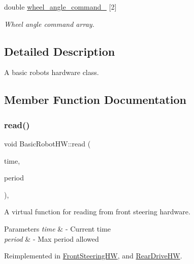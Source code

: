\begin{DoxyCompactItemize}
\mbox{\label{classBasicRobotHW_a10eda38eb2d290958f80f4bbeb33a66d}} 
double \hyperlink{classBasicRobotHW_a10eda38eb2d290958f80f4bbeb33a66d}{wheel\+\_\+angle\+\_\+command\+\_\+} \mbox{[}2\mbox{]}
\begin{DoxyCompactList}\small\item\em Wheel angle command array. \end{DoxyCompactList}\end{DoxyCompactItemize}


\subsection{Detailed Description}
A basic robot\textquotesingle{}s hardware class. 

\subsection{Member Function Documentation}
\mbox{\label{classBasicRobotHW_a4246adb060fa49a3eb9d5d26845b6425}} 
\subsubsection{\texorpdfstring{read()}{read()}}
{\footnotesize\ttfamily void Basic\+Robot\+H\+W\+::read (\begin{DoxyParamCaption}\item[{const ros\+::\+Time \&}]{time,  }\item[{const ros\+::\+Duration \&}]{period }\end{DoxyParamCaption})\hspace{0.3cm}{\ttfamily [override]}, {\ttfamily [virtual]}}



A virtual function for reading from front steering hardware. 


\begin{DoxyParams}{Parameters}
{\em time} & -\/ Current time \\
\hline
{\em period} & -\/ Max period allowed \\
\hline
\end{DoxyParams}


Reimplemented in \hyperlink{classFrontSteeringHW_aa037e3ea1fbc4e58b40e236810bed3ca}{Front\+Steering\+HW}, and \hyperlink{classRearDriveHW_adcce3bb0a7735810edeaf44bb2f71dee}{Rear\+Drive\+HW}.

